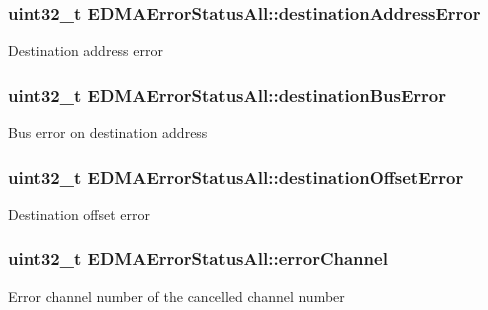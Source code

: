 \subsubsection[{\texorpdfstring{destination\+Address\+Error}{destinationAddressError}}]{\setlength{\rightskip}{0pt plus 5cm}uint32\+\_\+t E\+D\+M\+A\+Error\+Status\+All\+::destination\+Address\+Error}\hypertarget{unionEDMAErrorStatusAll_a79ae09640e957c306a648e5af0b8c906}{}\label{unionEDMAErrorStatusAll_a79ae09640e957c306a648e5af0b8c906}
Destination address error 
\subsubsection[{\texorpdfstring{destination\+Bus\+Error}{destinationBusError}}]{\setlength{\rightskip}{0pt plus 5cm}uint32\+\_\+t E\+D\+M\+A\+Error\+Status\+All\+::destination\+Bus\+Error}\hypertarget{unionEDMAErrorStatusAll_a6a765695f43c6c4526079f2485af3e8d}{}\label{unionEDMAErrorStatusAll_a6a765695f43c6c4526079f2485af3e8d}
Bus error on destination address 
\subsubsection[{\texorpdfstring{destination\+Offset\+Error}{destinationOffsetError}}]{\setlength{\rightskip}{0pt plus 5cm}uint32\+\_\+t E\+D\+M\+A\+Error\+Status\+All\+::destination\+Offset\+Error}\hypertarget{unionEDMAErrorStatusAll_a4128b548169ddf05b80cac1cc8961581}{}\label{unionEDMAErrorStatusAll_a4128b548169ddf05b80cac1cc8961581}
Destination offset error 
\subsubsection[{\texorpdfstring{error\+Channel}{errorChannel}}]{\setlength{\rightskip}{0pt plus 5cm}uint32\+\_\+t E\+D\+M\+A\+Error\+Status\+All\+::error\+Channel}\hypertarget{unionEDMAErrorStatusAll_aed7a2751b3f5c2bf107e374af098bf5d}{}\label{unionEDMAErrorStatusAll_aed7a2751b3f5c2bf107e374af098bf5d}
Error channel number of the cancelled channel number 

